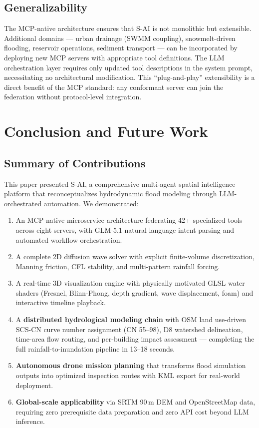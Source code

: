 \documentclass[11pt, a4paper]{article}
\begin{document}
\subsection{Generalizability}

The MCP-native architecture ensures that S-AI is not monolithic but extensible. Additional domains --- urban drainage (SWMM coupling), snowmelt-driven flooding, reservoir operations, sediment transport --- can be incorporated by deploying new MCP servers with appropriate tool definitions. The LLM orchestration layer requires only updated tool descriptions in the system prompt, necessitating no architectural modification. This ``plug-and-play'' extensibility is a direct benefit of the MCP standard: any conformant server can join the federation without protocol-level integration.

\section{Conclusion and Future Work}
\label{sec:conclude}

\subsection{Summary of Contributions}

This paper presented S-AI, a comprehensive multi-agent spatial intelligence platform that reconceptualizes hydrodynamic flood modeling through LLM-orchestrated automation. We demonstrated:

\begin{enumerate}[leftmargin=1.5em]
  \item An MCP-native microservice architecture federating 42+ specialized tools across eight servers, with GLM-5.1 natural language intent parsing and automated workflow orchestration.
  \item A complete 2D diffusion wave solver with explicit finite-volume discretization, Manning friction, CFL stability, and multi-pattern rainfall forcing.
  \item A real-time 3D visualization engine with physically motivated GLSL water shaders (Fresnel, Blinn-Phong, depth gradient, wave displacement, foam) and interactive timeline playback.
  \item A \textbf{distributed hydrological modeling chain} with OSM land use-driven SCS-CN curve number assignment (CN 55--98), D8 watershed delineation, time-area flow routing, and per-building impact assessment --- completing the full rainfall-to-inundation pipeline in 13--18 seconds.
  \item \textbf{Autonomous drone mission planning} that transforms flood simulation outputs into optimized inspection routes with KML export for real-world deployment.
  \item \textbf{Global-scale applicability} via SRTM 90\,m DEM and OpenStreetMap data, requiring zero prerequisite data preparation and zero API cost beyond LLM inference.
\end{enumerate}
\end{document}
